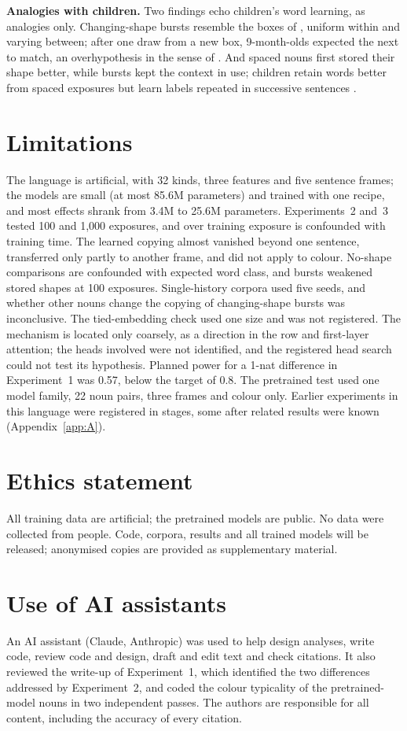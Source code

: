 \documentclass[11pt]{article}
\begin{document}
\textbf{Analogies with children.} Two findings echo children's word learning, as analogies only. Changing-shape bursts resemble the boxes of \citet{dewar2010}, uniform within and varying between; after one draw from a new box, 9-month-olds expected the next to match, an overhypothesis in the sense of \citet{kemp2007}. And spaced nouns first stored their shape better, while bursts kept the context in use; children retain words better from spaced exposures \citep{childers2002,vlach2008} but learn labels repeated in successive sentences \citep{schwab2016}.

\section*{Limitations}
The language is artificial, with 32 kinds, three features and five sentence frames; the models are small (at most 85.6M parameters) and trained with one recipe, and most effects shrank from 3.4M to 25.6M parameters. Experiments~2 and~3 tested 100 and 1,000 exposures, and over training exposure is confounded with training time. The learned copying almost vanished beyond one sentence, transferred only partly to another frame, and did not apply to colour. No-shape comparisons are confounded with expected word class, and bursts weakened stored shapes at 100 exposures. Single-history corpora used five seeds, and whether other nouns change the copying of changing-shape bursts was inconclusive. The tied-embedding check used one size and was not registered. The mechanism is located only coarsely, as a direction in the row and first-layer attention; the heads involved were not identified, and the registered head search could not test its hypothesis. Planned power for a 1-nat difference in Experiment~1 was 0.57, below the target of 0.8. The pretrained test used one model family, 22 noun pairs, three frames and colour only. Earlier experiments in this language were registered in stages, some after related results were known (Appendix~\ref{app:A}).

\section*{Ethics statement}
All training data are artificial; the pretrained models are public. No data were collected from people. Code, corpora, results and all trained models will be released; anonymised copies are provided as supplementary material.

\section*{Use of AI assistants}
An AI assistant (Claude, Anthropic) was used to help design analyses, write code, review code and design, draft and edit text and check citations. It also reviewed the write-up of Experiment~1, which identified the two differences addressed by Experiment~2, and coded the colour typicality of the pretrained-model nouns in two independent passes. The authors are responsible for all content, including the accuracy of every citation.
\end{document}
